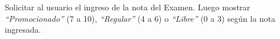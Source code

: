 Solicitar al usuario el ingreso de la nota del Examen. Luego mostrar \textit{``Promocionado''} (7 a 10), \textit{``Regular''} (4 a 6) o \textit{``Libre''} (0 a 3) seg\'un la nota ingresada.



\volverindice
\newpage
